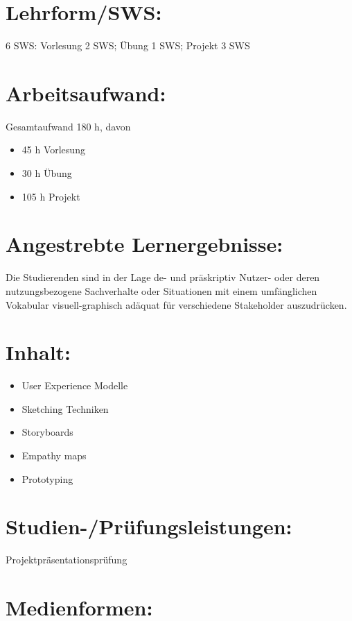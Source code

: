\section*{Lehrform/SWS:}\label{lehrformsws-7}

6 SWS: Vorlesung 2 SWS; Übung 1 SWS; Projekt 3 SWS

\section*{Arbeitsaufwand:}\label{arbeitsaufwand-13}

Gesamtaufwand 180 h, davon

\begin{itemize}
\item
  45 h Vorlesung
\item
  30 h Übung
\item
  105 h Projekt
\end{itemize}

\section*{Angestrebte
Lernergebnisse:}\label{angestrebte-lernergebnisse-7}

Die Studierenden sind in der Lage de- und präskriptiv Nutzer- oder deren
nutzungsbezogene Sachverhalte oder Situationen mit einem umfänglichen
Vokabular visuell-graphisch adäquat für verschiedene Stakeholder
auszudrücken.

\section*{Inhalt:}\label{inhalt-7}

\begin{itemize}
\item
  User Experience Modelle
\item
  Sketching Techniken
\item
  Storyboards
\item
  Empathy maps
\item
  Prototyping
\end{itemize}

\section*{Studien-/Prüfungsleistungen:}\label{studien-pruxfcfungsleistungen-7}

Projektpräsentationsprüfung

\section*{Medienformen:}\label{medienformen-7}

